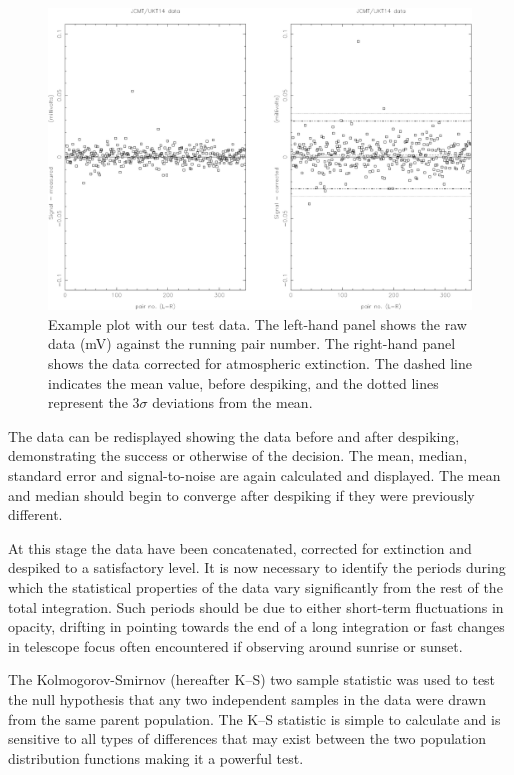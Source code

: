 \documentclass{article}
\begin{document}
\begin{figure}[ht]
\includegraphics[width=\textwidth]{mtun144fig1}
\caption{
Example plot with our test data.
The left-hand panel shows the raw data (mV) against the running
pair number. The right-hand panel shows the data corrected for
atmospheric extinction. The dashed line indicates the mean value, before
despiking, and the dotted lines represent the 3$\sigma$ deviations from the
mean.}
\label{fig:data}
\end{figure}


The data can be redisplayed showing the data before and after despiking,
demonstrating the success or otherwise of the decision. The
mean, median, standard error and signal-to-noise are again calculated and
displayed.  The mean and median should begin to converge after despiking if
they were previously different.

 At this stage the data have been concatenated,
corrected for extinction
and despiked to a satisfactory level. It is now necessary to identify the
periods during which the statistical properties of the data vary significantly
from the rest of the total integration. Such periods should be due to either
short-term fluctuations in opacity, drifting in pointing towards the end of
a long integration or fast changes in telescope focus often encountered if
observing around sunrise or sunset.

The Kolmogorov-Smirnov (hereafter K--S) two sample statistic was used  to test
the null hypothesis that any two independent samples in the data were drawn from
the same parent population. The K--S statistic is simple to calculate and
is sensitive to all types of differences that may exist between the two
population distribution functions making it a powerful test.
\end{document}
